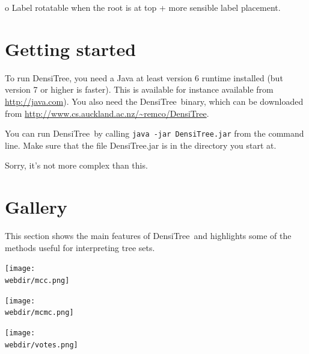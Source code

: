 \documentclass{article}
\def\DensiTree{DensiTree}
\def\webdir{/Users/remco/research/DensiTree/web}
\begin{document}
o Label rotatable when the root is at top + more sensible label placement.

\newpage
\section{Getting started\label{sec.start}}

To run \DensiTree, you need a Java at least version 6 runtime installed (but version 7 or higher is faster). This is available for instance available from \url{http://java.com}). You also need the \DensiTree\ binary,
which can be downloaded from \url{http://www.cs.auckland.ac.nz/~remco/DensiTree}.

You can run \DensiTree\ by calling {\tt java -jar DensiTree.jar} from the command line. Make sure that the file DensiTree.jar is in the directory you start at.

Sorry, it's not more complex than this.

\newpage
\section{Gallery\label{sec.gal}}

This section shows the main features of \DensiTree\ and highlights some of the
methods useful for interpreting tree sets.

\begin{center}
\texttt{[image: \\webdir/mcc.png]}
\end{center}

\newpage
\begin{center}
\texttt{[image: \\webdir/mcmc.png]}
\end{center}

\newpage
\begin{center}
\texttt{[image: \\webdir/votes.png]}
\end{center}
\end{document}
